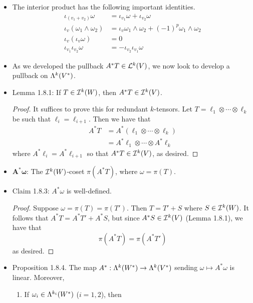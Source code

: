 \documentclass[../notes.tex]{subfiles}
\begin{document}
\begin{itemize}
    \item The interior product has the following important identities.
    \begin{align*}
        \iota_{(v_1+v_2)}\omega &= \iota_{v_1}\omega+\iota_{v_2}\omega\\
        \iota_v(\omega_1\wedge\omega_2) &= \iota_v\omega_1\wedge\omega_2+(-1)^p\omega_1\wedge\omega_2\\
        \iota_v(\iota_v\omega) &= 0\\
        \iota_{v_1}\iota_{v_2}\omega &= -\iota_{v_2}\iota_{v_1}\omega
    \end{align*}
    \item {}As we developed the pullback $A^*T\in\lin[k]{V}$, we now look to develop a pullback on $\lam[k]{V^*}$.
    \item Lemma 1.8.1: If $T\in\ide[k]{W}$, then $A^*T\in\ide[k]{V}$.
    \begin{proof}
        It suffices to prove this for redundant $k$-tensors. Let $T=\ell_1\otimes\cdots\otimes\ell_k$ be such that $\ell_i=\ell_{i+1}$. Then we have that
        \begin{align*}
            A^*T &= A^*(\ell_1\otimes\cdots\otimes\ell_k)\\
            &= A^*\ell_1\otimes\cdots\otimes A^*\ell_k\tag*{Exercise 1.3.iii}
        \end{align*}
        where $A^*\ell_i=A^*\ell_{i+1}$ so that $A^*T\in\ide[k]{V}$, as desired.
    \end{proof}
    \item $\bm{A^*\omega}$: The $\ide[k]{W}$-coset $\pi(A^*T)$, where $\omega=\pi(T)$.
    \item Claim 1.8.3: $A^*\omega$ is well-defined.
    \begin{proof}
        Suppose $\omega=\pi(T)=\pi(T')$. Then $T=T'+S$ where $S\in\ide[k]{W}$. It follows that $A^*T=A^*T'+A^*S$, but since $A^*S\in\ide[k]{V}$ (Lemma 1.8.1), we have that
        \begin{equation*}
            \pi(A^*T) = \pi(A^*T')
        \end{equation*}
        as desired.
    \end{proof}
    \item Proposition 1.8.4. The map $A^*:\lam[k]{W^*}\to\lam[k]{V^*}$ sending $\omega\mapsto A^*\omega$ is linear. Moreover,
    \begin{enumerate}
        \item If $\omega_i\in\lam[k_i]{W^*}$ ($i=1,2$), then
        \begin{equation*}

\end{equation*}
\end{enumerate}
\end{itemize}
\end{document}
